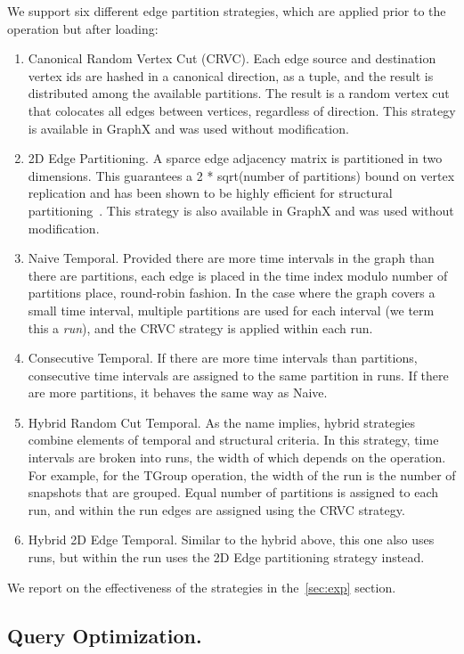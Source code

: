 We support six different edge partition strategies, which are
applied prior to the operation but after loading:
\begin{enumerate}
\item Canonical Random Vertex Cut (CRVC).  Each edge source and destination
  vertex ids are hashed in a canonical direction, as a tuple, and the
  result is distributed among the available partitions.  The result is
  a random vertex cut that colocates all edges between vertices,
  regardless of direction.  This strategy is available in GraphX and
  was used without modification.
\item 2D Edge Partitioning.  A sparce edge adjacency matrix is
  partitioned in two dimensions.  This guarantees a 2 * sqrt(number of
  partitions) bound on vertex replication and has been shown to be
  highly efficient for structural partitioning~\cite{}.  This strategy
  is also available in GraphX and was used without modification.
\item Naive Temporal.  Provided there are more time intervals in the
  graph than there are partitions, each edge is placed in the time
  index modulo number of partitions place, round-robin fashion.  In
  the case where the graph covers a small time interval, multiple
  partitions are used for each interval (we term this a {\em run}),
  and the CRVC strategy is applied within each run.
\item Consecutive Temporal.  If there are more time intervals than
  partitions, consecutive time intervals are assigned to the same
  partition in runs.  If there are more partitions, it behaves the
  same way as Naive.
\item Hybrid Random Cut Temporal.  As the name implies, hybrid
  strategies combine elements of temporal and structural criteria.  In
  this strategy, time intervals are broken into runs, the width of
  which depends on the operation.  For example, for the TGroup
  operation, the width of the run is the number of snapshots that are
  grouped.  Equal number of partitions is assigned to each run, and
  within the run edges are assigned using the CRVC strategy.
\item Hybrid 2D Edge Temporal.  Similar to the hybrid above, this one
  also uses runs, but within the run uses the 2D Edge partitioning
  strategy instead.
\end{enumerate}

We report on the effectiveness of the strategies in the~\ref{sec:exp}
section.

\subsection{Query Optimization.}

